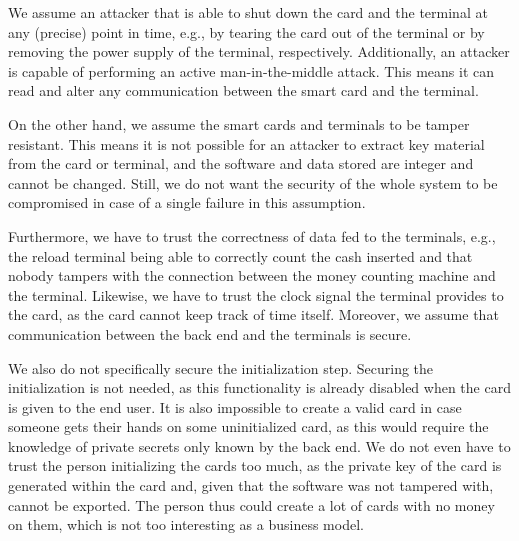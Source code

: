 We assume an attacker that is able to shut down the card and the terminal at any (precise) point in time, e.g., by tearing the card out of the terminal or by removing the power supply of the terminal, respectively.
Additionally, an attacker is capable of performing an active man-in-the-middle attack.
This means it can read and alter any communication between the smart card and the terminal.

On the other hand, we assume the smart cards and terminals to be tamper resistant.
This means it is not possible for an attacker to extract key material from the card or terminal, and the software and data stored are integer and cannot be changed.
Still, we do not want the security of the whole system to be compromised in case of a single failure in this assumption.

Furthermore, we have to trust the correctness of data fed to the terminals, e.g., the reload terminal being able to correctly count the cash inserted and that nobody tampers with the connection between the money counting machine and the terminal.
Likewise, we have to trust the clock signal the terminal provides to the card, as the card cannot keep track of time itself.
Moreover, we assume that communication between the back end and the terminals is secure.

We also do not specifically secure the initialization step.
Securing the initialization is not needed, as this functionality is already disabled when the card is given to the end user.
It is also impossible to create a valid card in case someone gets their hands on some uninitialized card, as this would require the knowledge of private secrets only known by the back end.
We do not even have to trust the person initializing the cards too much, as the private key of the card is generated within the card and, given that the software was not tampered with, cannot be exported.
The person thus could create a lot of cards with no money on them, which is not too interesting as a business model.


